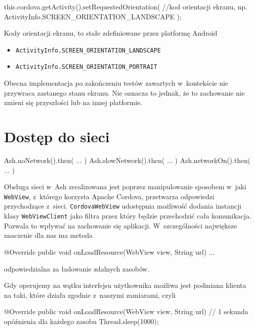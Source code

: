 \documentclass[brudnopis]{xmgr}
\begin{document}
\begin{javacode}
this.cordova.getActivity().setRequestedOrientation(
  //kod orientacji ekranu, np. 
  ActivityInfo.SCREEN_ORIENTATION_LANDSCAPE
);
\end{javacode}

Kody orientacji ekranu, to stałe zdefiniowane przez platformę Android
\begin{itemize}
  \item \texttt{ActivityInfo.SCREEN\_ORIENTATION\_LANDSCAPE}
  \item \texttt{ActivityInfo.SCREEN\_ORIENTATION\_PORTRAIT}
\end{itemize}

Obecna implementacja po zakończeniu testów zawartych w~kontekście nie przywraca zastanego stanu ekranu. Nie oznacza to jednak, że to zachowanie nie zmieni się przyszłości lub na innej platformie.

\section{Dostęp do sieci}

\begin{javascriptcode}
Ash.noNetwork().then( ... ) 
Ash.slowNetwork().then( ... ) 
Ash.networkOn().then( ... ) 
\end{javascriptcode}

Obsługa sieci w~Ash zrealizowana jest poprzez manipulowanie sposobem w~jaki \texttt{WebView}, z~którego korzysta Apache Cordova, przetwarza odpowiedzi przychodzące z~sieci. \texttt{CordovaWebView} udostępnia możliwość dodania instancji klasy \texttt{WebViewClient} jako filtra przez który będzie przechodzić cała komunikacja. Pozwala to wpływać na zachowanie się aplikacji. W~szczególności największe znaczenie dla nas ma metoda

\begin{javacode}
   @Override
   public void onLoadResource(WebView view, String url) {
       ...
   }
\end{javacode}

\noindent odpowiedzialna za ładowanie zdalnych zasobów.

Gdy operujemy na wątku interfejsu użytkownika możliwa jest podmiana klienta na taki, które działa zgodnie z~naszymi zamiarami, czyli 

\begin{javacode}
   @Override
   public void onLoadResource(WebView view, String url) {
       // 1 sekunda opóźnienia dla każdego zasobu
       Thread.sleep(1000); 
   }
\end{javacode}
\end{document}

